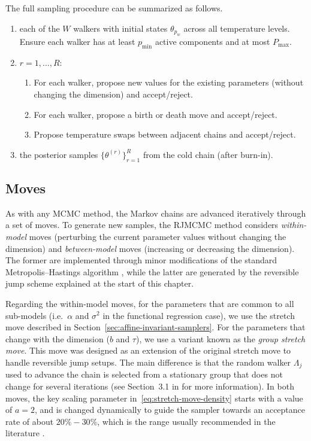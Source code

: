 The full sampling procedure can be summarized as follows.
\begin{enumerate}
  \item {} each of the \(W\) walkers with initial states \(\theta_{p_w}\) across all temperature levels. Ensure each walker has at least \(p_{\min}\) active components and at most \(P_{\max}\).
  \item {} \(r=1,\dots, R\):
  \begin{enumerate}
    \item For each walker, propose new values for the existing parameters (without changing the dimension) and accept/reject.
    \item For each walker, propose a birth or death move and accept/reject.
    \item Propose temperature swaps between adjacent chains and accept/reject.
  \end{enumerate}
  \item {} the posterior samples \(\{\theta^{(r)}\}_{r=1}^R\) from the cold chain (after burn-in).
\end{enumerate}

\subsection{Moves}

 As with any \acs{MCMC} method, the Markov chains are advanced iteratively through a set of moves. To generate new samples, the \acs{RJMCMC} method considers \textit{within-model} moves (perturbing the current parameter values without changing the dimension) and \textit{between-model} moves (increasing or decreasing the dimension). The former are implemented through minor modifications of the standard Metropolis--Hastings algorithm \citep{brooks2011handbook}, while the latter are generated by the reversible jump scheme explained at the start of this chapter.
 
Regarding the within-model moves, for the parameters that are common to all sub-models (i.e.\ \(\alpha\) and \(\sigma^2\) in the functional regression case), we use the stretch move described in Section~\ref{sec:affine-invariant-samplers}. For the parameters that change with the dimension (\(b\) and \(\tau\)), we use a variant known as the \textit{group stretch move}. This move was designed as an extension of the original stretch move to handle reversible jump setups. The main difference is that the random walker \(\Lambda_j\) used to advance the chain is selected from a stationary group that does not change for several iterations (see Section~3.1 in \citealp{karnesis2023eryn} for more information). In both moves, the key scaling parameter in~\eqref{eq:stretch-move-density} starts with a value of \(a=2\), and is changed dynamically to guide the sampler towards an acceptance rate of about \(20\%-30\%\), which is the range usually recommended in the literature \citep[e.g.][]{rosenthal2011optimal}.

